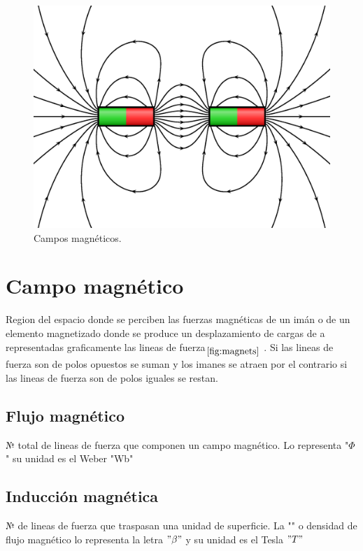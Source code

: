 \documentclass{report}
\begin{document}
\begin{figure}[ht]
  \centering
  \caption{Campos magnéticos.}
  \label{fig:magnets}
  \medskip
  \includegraphics[scale=0.5]{magnets.eps}
\end{figure}

\newpage
  \section{Campo magnético }\label{sec:campo_magnético}
Region del espacio donde se perciben las fuerzas magnéticas de un imán o de un elemento magnetizado  
donde se produce un desplazamiento de cargas de  a  representadas graficamente 
las lineas de fuerza\(_{\ref{fig:magnets}}\)
.  Si las lineas de fuerza son de polos opuestos se suman y los imanes se atraen por el 
contrario si las lineas de fuerza son de polos iguales se restan.

  \subsection{Flujo magnético }\label{ssec:Flujo}
№ total de lineas de fuerza que componen un campo magnético. Lo representa "\(\Phi\)" su unidad es el Weber "Wb"

  \subsection{Inducción magnética}\label{ssec:Inducción}
№ de lineas de fuerza que traspasan una unidad de superficie. La "" o densidad de flujo magnético 
lo representa la letra \("\beta"\) y su unidad es el Tesla \("T"\)
\end{document}
